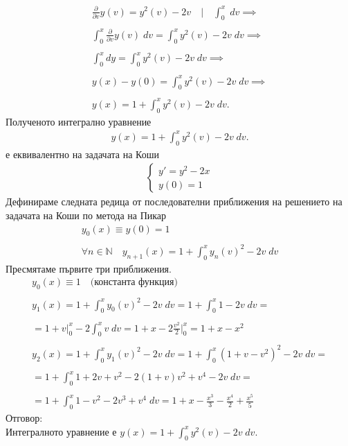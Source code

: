 \documentclass[a4paper, 12pt, oneside]{article}
\newcommand{\N}{\mathbb{N}}
\begin{document}
\begin{align*}
    \frac{\partial}{\partial v} y(v) = y^2(v) - 2v \quad \Big| \quad \displaystyle\int_0^x \; dv \implies \\\\
    \displaystyle\int_0^x \frac{\partial}{\partial v} y(v) \; dv = \displaystyle\int_0^x y^2(v) - 2v \; dv \implies \\\\
    \displaystyle\int_0^x dy = \displaystyle\int_0^x y^2(v) - 2v \; dv \implies \\\\
    y(x) - y(0) = \displaystyle\int_0^x y^2(v) - 2v \; dv \implies \\\\
    y(x) = 1 + \displaystyle\int_0^x y^2(v) - 2v \; dv.
\end{align*}
Полученото интегрално уравнение
\begin{align*}
    y(x) = 1 + \displaystyle\int_0^x y^2(v) - 2v \; dv.
\end{align*} е еквивалентно на задачата на Коши
\begin{align*}
    \begin{cases}
        y' = y^2 - 2x \\
        y(0) = 1
    \end{cases}
\end{align*}
Дефинираме следната редица от последователни приближения
на решението на задачата на Коши по метода на Пикар
\begin{align*}
    y_0(x) \equiv y(0) = 1 \\\\
    \forall n \in \N \quad y_{n + 1}(x) = 1 + \displaystyle\int_0^x y_n(v)^2 - 2v \; dv
\end{align*}
Пресмятаме първите три приближения.
\begin{align*}
    y_0(x) \equiv 1 \quad \text{(константа функция)} \\\\
    y_1(x) = 1 + \displaystyle\int_0^x y_0(v)^2 - 2v \; dv = 1 + \displaystyle\int_0^x 1 - 2v \; dv = \\\\
    = 1 + v\displaystyle|_0^x -2\displaystyle\int_0^x v \; dv = 1 + x -2\frac{v^2}{2}\displaystyle|_0^x = 1 + x - x^2 \\\\
    y_2(x) = 1 + \displaystyle\int_0^x y_1(v)^2 - 2v \; dv = 1 + \displaystyle\int_0^x (1 + v - v^2)^2 - 2v \; dv = \\\\
    = 1 + \displaystyle\int_0^x 1 + 2v + v^2 -2(1 + v)v^2 + v^4 - 2v \; dv = \\\\
    = 1 + \displaystyle\int_0^x 1 -v^2 -2v^3 + v^4 \; dv
    = 1 + x -\frac{x^3}{3} - \frac{x^4}{2} + \frac{x^5}{5}
\end{align*}
Отговор: \\
Интегралното уравнение е $ y(x) = 1 + \displaystyle\int_0^x y^2(v) - 2v \; dv$. \\
\end{document}

